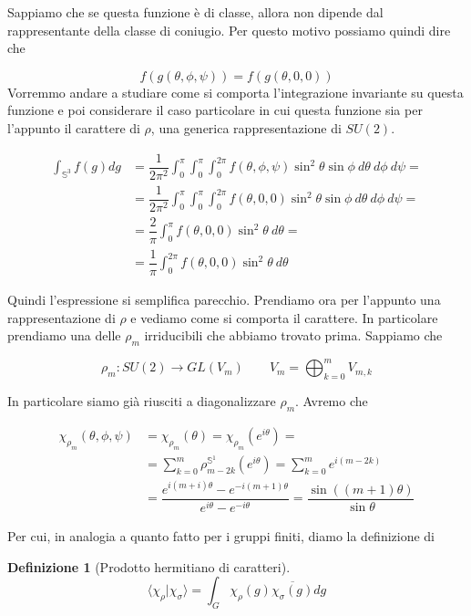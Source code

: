 \documentclass[11pt]{article}
\theoremstyle{plain}
\theoremstyle{definition}
\newtheorem{defn}{Definizione}[section]
\theoremstyle{remark}
\newcommand{\dsum}{\displaystyle\sum}
\newcommand{\dint}{\displaystyle\int}
\begin{document}
 Sappiamo che se questa funzione è di classe, allora non dipende dal rappresentante della classe di coniugio. Per questo motivo possiamo quindi dire che

 \[ f(g(\theta, \phi, \psi)) = f(g(\theta, 0 , 0)) \]
 Vorremmo andare a studiare come si comporta l'integrazione invariante su questa funzione e poi considerare il caso particolare in cui questa funzione sia per l'appunto il carattere di $\rho$, una generica rappresentazione di $SU(2)$.

 \begin{align*}
 \dint_{\mathbb{S}^3} f(g) dg &= \dfrac{1}{2\pi^2} \dint_0^\pi \dint_0^{\pi} \dint_0 ^{2\pi} f(\theta, \phi, \psi) \sin^2\theta\sin\phi \ d\theta \ d\phi \ d\psi = \\
 &=\dfrac{1}{2\pi^2} \dint_0^\pi \dint_0^{\pi} \dint_0 ^{2\pi} f(\theta, 0, 0) \sin^2\theta\sin\phi \ d\theta \ d\phi \ d\psi = \\
 &= \dfrac{2}{\pi} \dint_0^\pi f(\theta, 0, 0) \sin^2\theta \ d\theta = \\
  &= \dfrac{1}{\pi} \dint_0^{2\pi} f(\theta, 0, 0) \sin^2\theta \ d\theta 
 \end{align*}
 
 Quindi l'espressione si semplifica parecchio. Prendiamo ora per l'appunto una rappresentazione di $\rho$ e vediamo come si comporta il carattere. In particolare prendiamo una delle $\rho_m$ irriducibili che abbiamo trovato prima. Sappiamo che

 \[ \rho_m: SU(2) \to GL(V_m) \qquad V_m = \bigoplus_{k=0}^m V_{m,k}\]
 
 In particolare siamo già riusciti a diagonalizzare $\rho_m$. Avremo che

 \begin{align*}
   \chi_{\rho_m} (\theta, \phi, \psi) &= \chi_{\rho_m}(\theta) = \chi_{\rho_m}(e^{i\theta}) = \\
   &= \dsum_{k=0}^m \rho_{m-2k}^{\mathbb{S}^1}(e^{i\theta}) = \dsum_{k=0}^m e^{i(m-2k)} \\
   &= \dfrac{e^{i(m+i)\theta} - e^{-i(m+1)\theta}}{e^{i\theta} - e^{-i\theta}} = \dfrac{\sin((m+1)\theta)}{\sin\theta}
 \end{align*} 
 


 Per cui, in analogia a quanto fatto per i gruppi finiti, diamo la definizione di

 \begin{defn}[Prodotto hermitiano di caratteri]

   \[
   \langle \chi_\rho | \chi_\sigma \rangle = \dint_G \chi_\rho(g) \overline{\chi_\sigma(g)} dg
   \]

 \end{defn}
\end{document}
